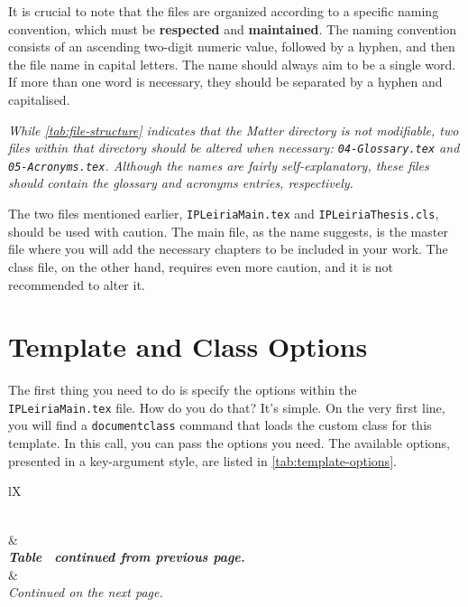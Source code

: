 {It is crucial to note that the files are organized according to a specific naming convention, which must be \textbf{respected} and \textbf{maintained}. The naming convention consists of an ascending two-digit numeric value, followed by a hyphen, and then the file name in capital letters. The name should always aim to be a single word. If more than one word is necessary, they should be separated by a hyphen and capitalised.


\begin{block}[note]
\textit{While \autoref{tab:file-structure} indicates that the \textit{Matter} directory is not modifiable, two files within that directory should be altered when necessary: \texttt{04-Glossary.tex} and \texttt{05-Acronyms.tex}. Although the names are fairly self-explanatory, these files should contain the glossary and acronyms entries, respectively.}
\end{block}

The two files mentioned earlier, \texttt{IPLeiriaMain.tex} and \texttt{IPLeiriaThesis.cls}, should be used with caution. The main file, as the name suggests, is the master file where you will add the necessary chapters to be included in your work. The class file, on the other hand, requires even more caution, and it is not recommended to alter it.

\section{Template and Class Options}
\label{sec:class-options}
The first thing you need to do is specify the options within the \texttt{IPLeiriaMain.tex} file. How do you do that? It's simple. On the very first line, you will find a \texttt{documentclass} command that loads the custom class for this template. In this call, you can pass the options you need. The available options, presented in a key-argument style, are listed in \autoref{tab:template-options}.

{
\setlength{\extrarowheight}{-1.75pt}
\begin{xltabular}{\textwidth}{lX}
\caption{Class options supported by the template.}
\label{tab:template-options} \\
%
\toprule 
{} &  \\ 
\midrule
\endfirsthead
%
%
{{\textit{\bfseries Table \thetable\ continued from previous page.}}} \\
%
\toprule 
{} &  \\ 
\midrule
\endhead
%
\bottomrule
\addlinespace[1mm]
%
{{\textit{Continued on the next page.}}} \\
\endfoot
\bottomrule
\endlastfoot


\end{xltabular}}}
